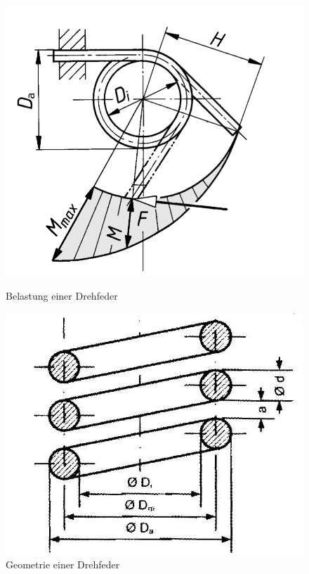 \begin{figure}[H]
	\centering
	\begin{minipage}[b]{0.45\linewidth}
		\includegraphics[width=\linewidth]{federn/drehfedern}
		\caption*{Belastung einer Drehfeder}
	\end{minipage}
	\begin{minipage}[b]{0.45\linewidth}
		\includegraphics[width=\linewidth]{federn/drehfedern-geometrie}
		\caption*{Geometrie einer Drehfeder}
	\end{minipage}
\end{figure}

